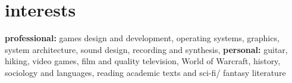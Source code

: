 \documentclass[]{friggeri-cv} %
\begin{document}

\section{interests}

\textbf{professional:} games design and development, operating systems, graphics, system architecture, sound design, recording and synthesis, 
\textbf{personal:} guitar, hiking, video games, film and quality television, World of Warcraft, history, sociology and languages, reading academic texts and sci-fi/ fantasy literature


%
%
%
%
%
%

\end{document}

